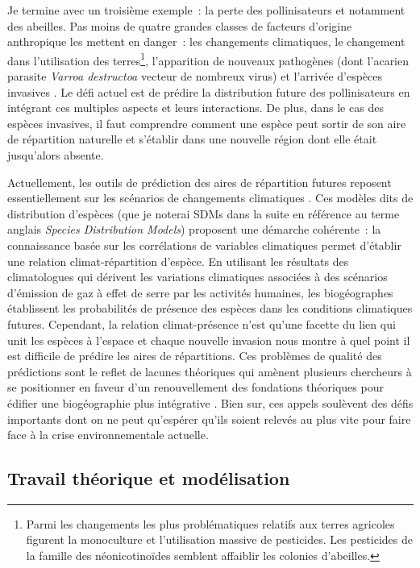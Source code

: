 Je termine avec un troisième exemple~: la perte des pollinisateurs et
notamment des abeilles. Pas moins de quatre grandes classes de facteurs
d'origine anthropique les mettent en danger~: les changements
climatiques, le changement dans l'utilisation des terres\footnote{Parmi
  les changements les plus problématiques relatifs aux terres agricoles
  figurent la monoculture et l'utilisation massive de pesticides. Les
  pesticides de la famille des néonicotinoïdes semblent affaiblir les
  colonies d'abeilles.}, l'apparition de nouveaux pathogènes (dont
l'acarien parasite \emph{Varroa destructoa} vecteur de nombreux virus)
et l'arrivée d'espèces invasives \citep[comme le frelon
asiatique][]{Vanbergen2013}. Le défi actuel est de prédire la
distribution future des pollinisateurs en intégrant ces multiples
aspects et leurs interactions. De plus, dans le cas des espèces
invasives, il faut comprendre comment une espèce peut sortir de son aire
de répartition naturelle et s'établir dans une nouvelle région dont elle
était jusqu'alors absente.

Actuellement, les outils de prédiction des aires de répartition futures
reposent essentiellement sur les scénarios de changements climatiques
\citep{Peterson2011}. Ces modèles dits de distribution d'espèces (que je
noterai SDMs dans la suite en référence au terme anglais \emph{Species
Distribution Models}) proposent une démarche cohérente~: la connaissance
basée sur les corrélations de variables climatiques permet d'établir une
relation climat-répartition d'espèce. En utilisant les résultats des
climatologues qui dérivent les variations climatiques associées à des
scénarios d'émission de gaz à effet de serre par les activités humaines,
les biogéographes établissent les probabilités de présence des espèces
dans les conditions climatiques futures. Cependant, la relation
climat-présence n'est qu'une facette du lien qui unit les espèces à
l'espace et chaque nouvelle invasion nous montre à quel point il est
difficile de prédire les aires de répartitions. Ces problèmes de qualité
des prédictions sont le reflet de lacunes théoriques qui amènent
plusieurs chercheurs à se positionner en faveur d'un renouvellement des
fondations théoriques pour édifier une biogéographie plus intégrative
\citep{Lomolino2000, Beck2012, Thuiller2013}. Bien sur, ces appels
soulèvent des défis importants dont on ne peut qu'espérer qu'ils soient
relevés au plus vite pour faire face à la crise environnementale
actuelle.

\subsection*{Travail théorique et
modélisation}\label{travail-thuxe9orique-et-moduxe9lisation}

